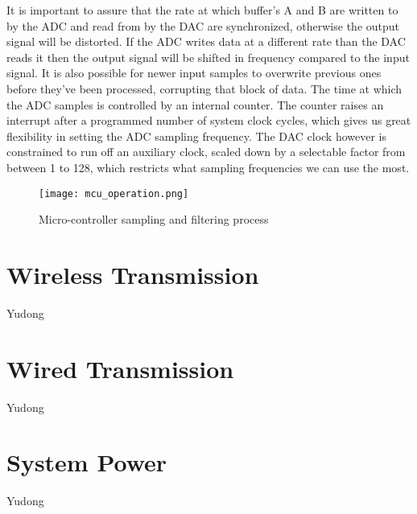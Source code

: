 It is important to assure that the rate at which buffer's A and B are written to by the ADC and read from by the DAC are synchronized, otherwise the output signal will be distorted. If the ADC writes data at a different rate than the DAC reads it then the output signal will be shifted in frequency compared to the input signal. It is also possible for newer input samples to overwrite previous ones before they've been processed, corrupting that block of data. The time at which the ADC samples is controlled by an internal counter. The counter raises an interrupt after a programmed number of system clock cycles, which gives us great flexibility in setting the ADC sampling frequency. The DAC clock however is constrained to run off an auxiliary clock, scaled down by a selectable factor from between 1 to 128, which restricts what sampling frequencies we can use the most.

\begin{figure}[!htb]
	\centering
		\texttt{[image: mcu\_operation.png]}
	\caption{Micro-controller sampling and filtering process}
	\label{fig:mcu_operation}
\end{figure}



\section{Wireless Transmission}
Yudong

\section{Wired Transmission}
Yudong

\section{System Power}
Yudong